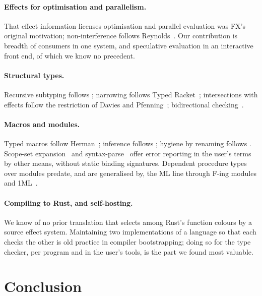 \documentclass[acmsmall,screen,review]{acmart}
\begin{document}
\paragraph{Effects for optimisation and parallelism.} That effect
information licenses optimisation and parallel evaluation was FX's
original motivation; non-interference follows
Reynolds~\cite{reynolds-interference}. Our contribution is breadth of
consumers in one system, and speculative evaluation in an interactive
front end, of which we know no precedent.

\paragraph{Structural types.} Recursive subtyping follows
\cite{amadio-cardelli,brandt-henglein}; narrowing follows Typed
Racket~\cite{typed-scheme,logical-types}; intersections with effects
follow the restriction of Davies and Pfenning~\cite{davies-pfenning};
bidirectional checking~\cite{local-type-inference,bidir-survey}.

\paragraph{Macros and modules.} Typed macros follow
Herman~\cite{herman-wand,herman-thesis}; inference follows
\cite{inferring-scope}; hygiene by renaming follows
\cite{clinger-rees,hanson,clinger-er}. Scope-set expansion~\cite{sets-of-scopes}
and syntax-parse~\cite{fortifying-macros} offer error reporting in the
user's terms by other means, without static binding signatures.
Dependent procedure types over modules predate, and are generalised
by, the ML line through F-ing modules and 1ML~\cite{leroy-applicative,f-ing,oneml}.

\paragraph{Compiling to Rust, and self-hosting.} We know of no prior
translation that selects among Rust's function colours by a source
effect system. Maintaining two implementations of a language so that
each checks the other is old practice in compiler bootstrapping; doing
so for the type checker, per program and in the user's tools, is the
part we found most valuable.

\section{Conclusion}
\end{document}
